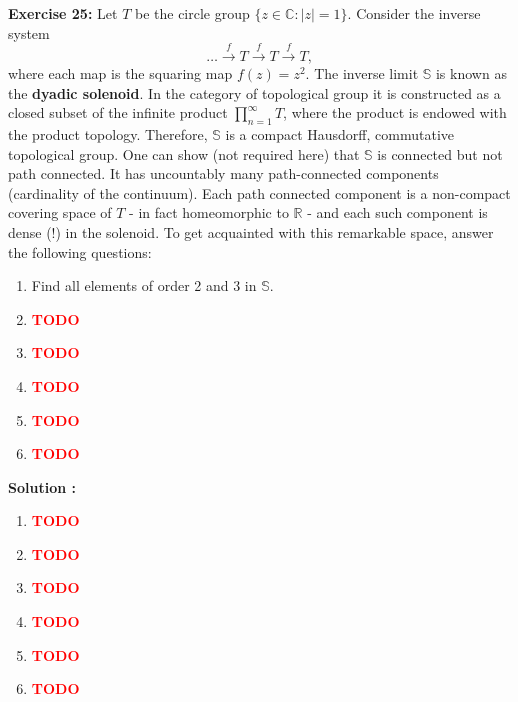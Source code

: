 \documentclass{article}
\newcommand{\C}{\mathbb{C}}
\newcommand{\R}{\mathbb{R}}
\newcommand{\td}{\textcolor{red}{\textbf{TODO}}}
\begin{document}
\noindent \textbf{Exercise 25:} Let $T$ be the circle group $\{z \in \C : |z| = 1\}$. Consider the inverse system 
$$\dots \overset{f}{\rightarrow} T \overset{f}{\rightarrow} T \overset{f}{\rightarrow} T,$$
where each map is the squaring map $f(z) = z^2$. The inverse limit $\mathbb{S}$ is known as the \textbf{dyadic solenoid}. In the category of topological group it is constructed as a closed subset of the infinite product $\prod_{n=1}^{\infty}T$, where the product is endowed with the product topology. Therefore, $\mathbb{S}$ is a compact Hausdorff, commutative topological group. One can show (not required here) that $\mathbb{S}$ is connected but not path connected. It has uncountably many path-connected components (cardinality of the continuum). Each path connected component is a non-compact covering space of $T$ - in fact homeomorphic to $\R$ - and each such component is dense (!) in the solenoid. To get acquainted with this remarkable space, answer the following questions: 
\begin{enumerate}[label=(\alph*)]
    \item Find all elements of order 2 and 3 in $\mathbb{S}$.
    \item \td
    \item \td
    \item \td
    \item \td
    \item \td \\
\end{enumerate}

\noindent \textbf{Solution :}
\begin{enumerate}[label=(\alph*)]
    \item \td
    \item \td
    \item \td
    \item \td
    \item \td
    \item \td
\end{enumerate}
\end{document}
